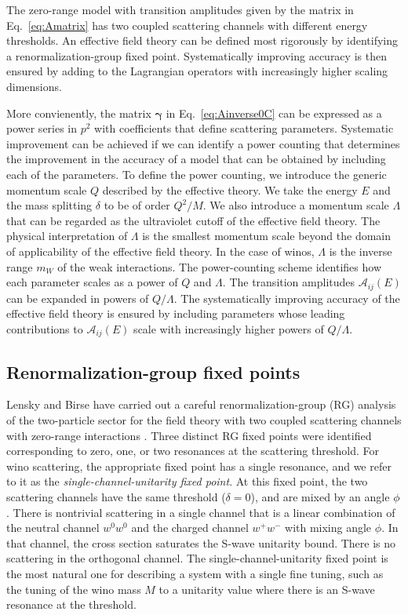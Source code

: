 \documentclass[%
 reprint,
 amsmath,amssymb,
 aps,
]{revtex4-1}
\begin{document}
The zero-range model with transition amplitudes given by the matrix in Eq.~\eqref{eq:Amatrix} has two coupled scattering channels with different energy thresholds.
An effective field theory can be defined most rigorously by identifying a renormalization-group fixed point. 
Systematically improving accuracy is then ensured by adding to the Lagrangian operators  with increasingly higher scaling dimensions.

More convienently, the matrix $\bm{\gamma}$ in Eq.~\eqref{eq:Ainverse0C} can be expressed as a power series in $p^2$ with coefficients that define scattering parameters.
Systematic improvement can be achieved if we can identify a power counting that determines the improvement in the accuracy of a model that can be obtained by including each of the parameters.  
To define the power counting, we introduce the generic momentum scale $Q$ described by the effective theory. 
We take the energy $E$ and the mass splitting $\delta$ to be of order $Q^2/M$. 
We also introduce a momentum scale $\Lambda$ that can be regarded as the ultraviolet cutoff of the effective field theory. 
The physical interpretation of $\Lambda$ is  the smallest momentum scale beyond the domain of applicability of the effective field theory. 
In the case of winos, $\Lambda$ is the inverse range $m_W$ of the weak interactions. 
The power-counting scheme identifies how each parameter scales as a power of $Q$ and $\Lambda$. 
The transition amplitudes $\mathcal{A}_{ij}(E)$ can be expanded in powers of $Q/\Lambda$. 
The systematically improving accuracy of the effective field theory is ensured by including parameters whose leading contributions to $\mathcal{A}_{ij}(E)$ scale with increasingly higher powers of $Q/\Lambda$.

\subsection{Renormalization-group fixed points}
\label{sec:RG}

Lensky and Birse have carried out a careful renormalization-group (RG) analysis of the two-particle sector for the field theory with two coupled scattering channels with zero-range interactions \cite{Lensky:2011he}. 
Three distinct RG fixed points were identified corresponding to zero, one, or two resonances at the scattering threshold.
For wino scattering, the appropriate fixed point has a single resonance, and we refer to it as the {\it single-channel-unitarity fixed point}. 
At this fixed point, the two scattering channels have the same threshold  ($\delta = 0$), and are mixed by an angle $\phi$.
There is nontrivial scattering in a single channel that is a linear combination of the neutral channel $w^0w^0$ and the charged channel $w^+ w^-$  with mixing angle $\phi$. 
In that channel, the cross section saturates the S-wave unitarity bound. 
There is no scattering in the orthogonal channel. 
The single-channel-unitarity fixed point is the most natural one for describing a system with a single fine tuning, such as the tuning of the wino mass $M$ to a unitarity value where there is an S-wave resonance at the threshold.
\end{document}
